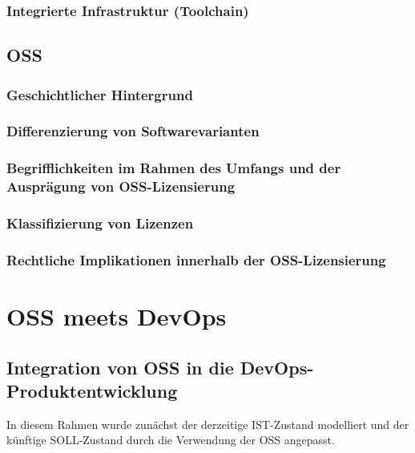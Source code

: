 \documentclass[12pt,titlepage]{article}
\begin{document}
\subsubsection{Integrierte Infrastruktur (Toolchain)}



\subsection{OSS}


\subsubsection{Geschichtlicher Hintergrund}


\subsubsection{Differenzierung von Softwarevarianten}


\subsubsection{Begrifflichkeiten im Rahmen des Umfangs und der Ausprägung von OSS-Lizensierung}


\subsubsection{Klassifizierung von Lizenzen}


\subsubsection{Rechtliche Implikationen innerhalb der OSS-Lizensierung}


\section{OSS meets DevOps}


\subsection{Integration von OSS in die DevOps-Produktentwicklung}
In diesem Rahmen wurde zunächst der derzeitige IST-Zustand modelliert und der künftige SOLL-Zustand durch die Verwendung der OSS angepasst.
\end{document}
